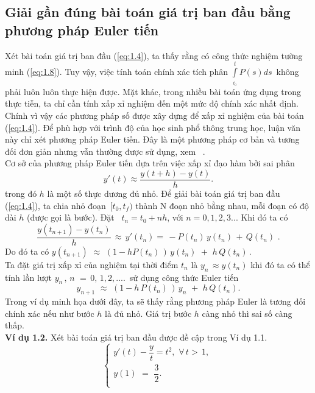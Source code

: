 \subsection{Giải gần đúng bài toán giá trị ban đầu bằng phương pháp Euler tiến}
Xét bài toán giá trị ban đầu (\ref{eq:1.4}), ta thấy rằng có công thức nghiệm tường minh (\ref{eq:1.8}). Tuy vậy, việc tính toán chính xác tích phân  $\int\limits_{_{{{t}_{0}}}}^{t}{P(s)ds}\,$ không phải luôn luôn thực hiện được. Mặt khác, trong nhiều bài toán ứng dụng trong thực tiễn, ta chỉ cần tính xấp xỉ nghiệm đến một mức độ chính xác nhất định. Chính vì vậy các phương pháp số được xây dựng để xấp xỉ nghiệm của bài toán (\ref{eq:1.4}). Để phù hợp với trình độ của học sinh phổ thông trung học, luận văn này chỉ xét phương pháp Euler tiến. Đây là một phương pháp cơ bản và tương đối đơn giản nhưng vẫn thường được sử dụng, xem~ \cite{ref2}.\\
Cơ sở của phương pháp Euler tiến dựa trên việc xấp xỉ đạo hàm bởi sai phân $$y'(t)\approx \dfrac{y(t+h)-y(t)}{h}.$$
trong đó $h$ là một số thực dương đủ nhỏ. Để giải bài toán giá trị ban đầu (\ref{eq:1.4}), ta chia nhỏ đoạn $\,\!\![{{t}_{0}},{{t}_{f}})$ thành N đoạn nhỏ bằng nhau, mỗi đoạn có độ dài $h$ (được gọi là bước). Đặt $\,\,\,{{t}_{n}}={{t}_{0}}+nh$, với $n=0, 1, 2, 3...$ Khi đó ta có
$$\dfrac{y({{t}_{n+1}})-y({{t}_{n}})}{h}\,\approx \,y'({{t}_{n}})=\,-P({{t}_{n}})\,y({{t}_{n}})\,+\,Q({{t}_{n}})\,\,.$$
Do đó ta có $y({{t}_{n+1}})\,\,\approx \,\,(1-hP({{t}_{n}})\,)\,y({{t}_{n}})\,\,+\,\,h\,Q({{t}_{n}})\,$.\\
Ta đặt giá trị xấp xỉ của nghiệm tại thời điểm ${{t}_{n}}$ là ${{y}_{n}}\,\approx y({{t}_{n}})$ khi đó ta có thể tính lần lượt   ${{y}_{n}}\,,\,n\,\,=\,0,\,1,2,....\,$ sử dụng công thức Euler tiến 
\begin{equation}
	{{y}_{n+1}}\,\,\approx \,\,(1-h\,P({{t}_{n}})\,)\,{{y}_{n}}\,\,+\,\,h\,Q({{t}_{n}}).
\label{eq:1.10}
\end{equation}
Trong ví dụ minh họa dưới đây, ta sẽ thấy rằng phương pháp Euler là tương đối chính xác nếu như bước $h$ là đủ nhỏ. Giá trị bước $h$ càng nhỏ thì sai số càng thấp.\\
\textbf{Ví dụ 1.2.} Xét bài toán giá trị ban đầu được đề cập trong Ví dụ 1.1.
\begin{equation}
	\left\{ \begin{array}{l}
	 y'(t)-\dfrac{y}{t}={{t}^{2}},\,\,\forall \,t>\,1,\, \\ 
	 y(1)\,\,=\,\,\dfrac{3}{2}. \\ 
\end{array} \right.
\label{eq:1.11}
\end{equation}
